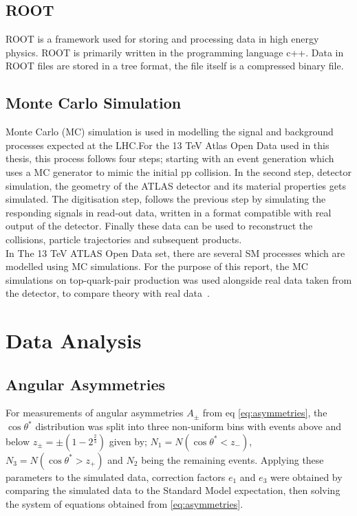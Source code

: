 \documentclass[12pt,a4paper]{article}
\numberwithin{equation}{section}
\begin{document}
\subsection{ROOT}
ROOT is a framework used for storing and processing data in high energy physics. ROOT is primarily written in the programming language c++. Data in ROOT files are stored in a tree format, the file itself is a compressed binary file. \cite{root}


\subsection{Monte Carlo Simulation}
Monte Carlo (MC) simulation is used in modelling the signal and background
processes expected at the LHC.\@ For the 13 TeV Atlas Open Data used in this
thesis, this process follows four steps; starting with an event generation which
uses a MC generator to mimic the initial pp collision. In the second step,
detector simulation, the geometry of the ATLAS detector and its material
properties gets simulated. The digitisation step, follows the previous step by
simulating the responding signals in read-out data, written in a format
compatible with real output of the detector. Finally these data can be
used to reconstruct the collisions, particle trajectories and subsequent
products.\\

In The 13 TeV ATLAS Open Data set, there are several SM processes which are
modelled using MC simulations. For the purpose of this report, the MC
simulations on top-quark-pair production was used alongside real data taken from
the detector, to compare theory with real data~\cite{mcopenatlas}.




\section{Data Analysis}

\subsection{Angular Asymmetries}
For measurements of angular asymmetries $A_{\pm}$ from eq \eqref{eq:asymmetries}, the $\cos\theta^{*}$ distribution was split into three non-uniform bins with events above and below $z_{\pm} = \pm(1-2^{\frac{2}{3}})$ given by; $N_1 = N(\cos \theta^{*}<z_-)$, $N_3 = N(\cos \theta^{*}>z_+)$ and $N_2$ being
the remaining events. Applying these parameters to the simulated data, correction factors $e_1$ and $e_3$ were obtained by comparing the simulated data to the Standard
Model expectation, then solving the system of equations obtained from \eqref{eq:asymmetries}. 
\end{document}
